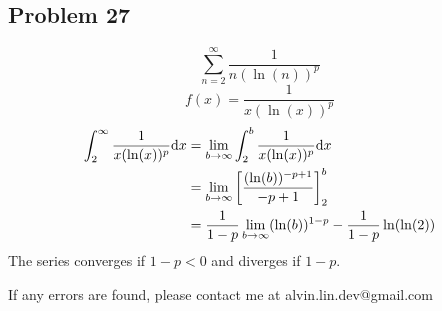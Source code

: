 \documentclass[letterpaper, 12pt]{math}
\begin{document}
\subsection*{Problem 27}
\[ \sum_{n=2}^{\infty}\frac{1}{n(\ln(n))^{p}} \]
\[ f(x) = \frac{1}{x(\ln(x))^{p}} \]
\begin{align*}
  \int_{2}^{\infty}\frac{1}{x(\ln(x))^{p}}\mathrm{d}{x} &=
    \lim_{b\to\infty}\int_{2}^{b}\frac{1}{x(\ln(x))^{p}}\mathrm{d}{x} \\
  &= \lim_{b\to\infty}\bigg[\frac{(\ln(b))^{-p+1}}{-p+1}\bigg]_{2}^{b} \\
  &= \frac{1}{1-p}\lim_{b\to\infty}(\ln(b))^{1-p}-\frac{1}{1-p}\ln(\ln(2)) \\
\end{align*}
The series converges if \( 1-p < 0 \) and diverges if \( 1 - p \).

\begin{center}
  If any errors are found, please contact me at alvin.lin.dev@gmail.com
\end{center}
\end{document}
